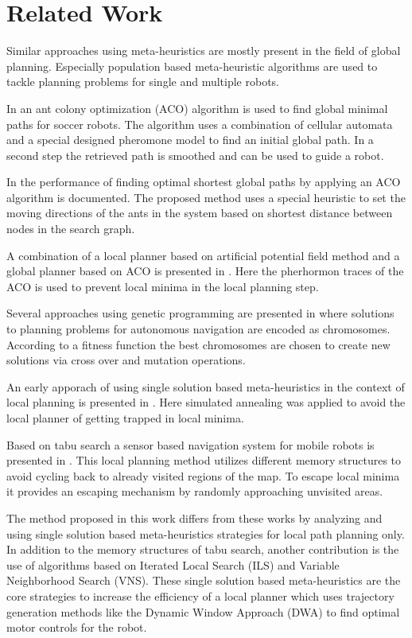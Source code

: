 \section{Related Work}\label{sec:relwork}
Similar approaches using meta-heuristics are mostly present in the field of global planning. Especially population based meta-heuristic algorithms are used to tackle planning problems for single and multiple robots.

In \cite{zhou2010improvedantcolony} an ant colony optimization (ACO) algorithm is used to find global minimal paths for soccer robots. 
The algorithm uses a combination of cellular automata and a special designed pheromone model to find an initial global path. 
In a second step the retrieved path is smoothed and can be used to guide a robot.

In \cite{buniyamin2011robotantcolony} the performance of finding optimal shortest global paths by applying an ACO algorithm is documented. 
The proposed method uses a special heuristic to set the moving directions of the ants in the system based on shortest distance between nodes in the search graph.  

A combination of a local planner based on artificial potential field method and a global planner based on ACO is presented in \cite{mei2006hybrid}. 
Here the pherhormon traces of the ACO is used to prevent local minima in the local planning step.

Several approaches using genetic programming are presented in \cite{manikas2007genetic} where solutions to planning problems for autonomous navigation are encoded as chromosomes. 
According to a fitness function the best chromosomes are chosen to create new solutions via cross over and mutation operations. 

An early apporach of using single solution based meta-heuristics in the context of local planning is presented in \cite{park2001obstacle}.
Here simulated annealing was applied to avoid the local planner of getting trapped in local minima.

Based on tabu search a sensor based navigation system for mobile robots is presented in \cite{masehian2008sensor}.
This local planning method utilizes different memory structures to avoid cycling back to already visited regions of the map. 
To escape local minima it provides an escaping mechanism by randomly approaching unvisited areas.

The method proposed in this work differs from these works by analyzing and using single solution based meta-heuristics strategies for local path planning only. 
In addition to the memory structures of tabu search, another contribution is the use of algorithms based on Iterated Local Search (ILS) and Variable Neighborhood Search (VNS). 
These single solution based meta-heuristics are the core strategies to increase the efficiency of a local planner which uses trajectory generation methods like the Dynamic Window Approach (DWA) to find optimal motor controls for the robot.

